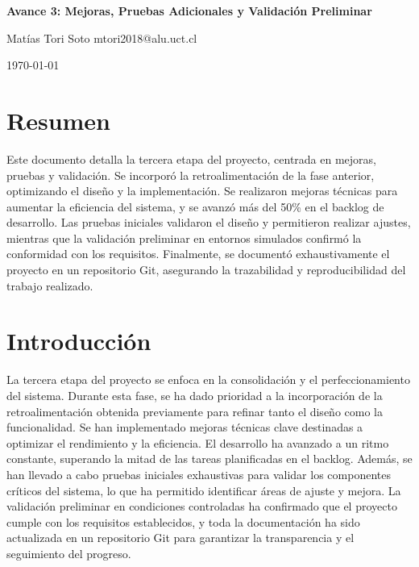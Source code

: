 \documentclass[10pt,a4paper]{report}
\begin{document}
\begin{titlepage}
    \centering
    \vspace*{1cm}
    {\Huge\bfseries Avance 3: Mejoras, Pruebas Adicionales y Validación
 Preliminar\par}
    \vspace{1.5cm}
    {\Large Matías Tori Soto } %
    {\large mtori2018@alu.uct.cl} %
    \vspace{0.5cm}

    \vspace{2cm}
    {\large \today\par}
    \vfill
\end{titlepage}

\tableofcontents
\newpage

\chapter{Resumen}
Este documento detalla la tercera etapa del proyecto, centrada en mejoras, pruebas y validación. Se incorporó la retroalimentación de la fase anterior, optimizando el diseño y la implementación. Se realizaron mejoras técnicas para aumentar la eficiencia del sistema, y se avanzó más del 50\% en el backlog de desarrollo. Las pruebas iniciales validaron el diseño y permitieron realizar ajustes, mientras que la validación preliminar en entornos simulados confirmó la conformidad con los requisitos. Finalmente, se documentó exhaustivamente el proyecto en un repositorio Git, asegurando la trazabilidad y reproducibilidad del trabajo realizado.

\chapter{Introducción}
La tercera etapa del proyecto se enfoca en la consolidación y el perfeccionamiento del sistema. Durante esta fase, se ha dado prioridad a la incorporación de la retroalimentación obtenida previamente para refinar tanto el diseño como la funcionalidad. Se han implementado mejoras técnicas clave destinadas a optimizar el rendimiento y la eficiencia. El desarrollo ha avanzado a un ritmo constante, superando la mitad de las tareas planificadas en el backlog. Además, se han llevado a cabo pruebas iniciales exhaustivas para validar los componentes críticos del sistema, lo que ha permitido identificar áreas de ajuste y mejora. La validación preliminar en condiciones controladas ha confirmado que el proyecto cumple con los requisitos establecidos, y toda la documentación ha sido actualizada en un repositorio Git para garantizar la transparencia y el seguimiento del progreso.
\end{document}
